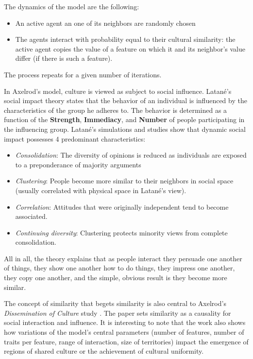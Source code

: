 \documentclass[twoside, 11pt, a4paper]{article}
\begin{document}
The dynamics of the model are the following:
\begin{itemize}
\item An active agent an one of its neighbors are randomly chosen
\item The agents interact with probability equal to their cultural similarity: the active agent copies the value of a feature on which it and its neighbor's value differ (if there is such a feature).
\end{itemize}
The process repeats for a given number of iterations.

In Axelrod's model, culture is viewed as subject to social influence. Latan\'e's social impact theory \cite{Latane} states that the behavior of an individual is influenced by the characteristics of the group he adheres to. The behavior is determined as a function of the \textbf{Strength}, \textbf{Immediacy}, and \textbf{Number} of people participating in the influencing group. Latan\'e's simulations and studies show that dynamic social impact possesses 4 predominant characteristics:

\begin{itemize}
\item \textit{Consolidation}: The diversity of opinions is reduced as individuals are exposed to a preponderance of majority arguments
\item \textit{Clustering}: People become more similar to their neighbors in social space (usually correlated with physical space in Latan\'e's view).
\item \textit{Correlation}: Attitudes that were originally independent tend to become associated.
\item \textit{Continuing diversity}: Clustering protects minority views from complete consolidation.
\end{itemize}

All in all, the theory explains that as people interact they persuade one another of things, they show one another how to do things, they impress one another, they copy one another, and the simple, obvious result is they become more similar.

The concept of similarity that begets similarity is also central to Axelrod's \textit{Dissemination of Culture} study \cite{Axelrod}. The paper sets similarity as a causality for social interaction and influence. It is interesting to note that the work also shows how variations of the model's central parameters (number of features, number of traits per feature, range of interaction, size of territories) impact the emergence of regions of shared culture or the achievement of cultural uniformity.
\end{document}
